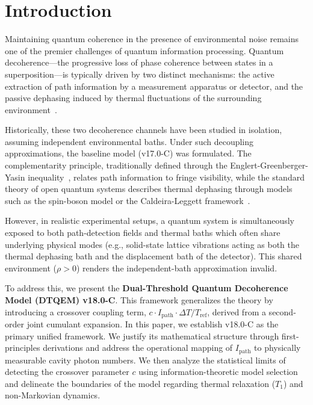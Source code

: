 \documentclass[reprint,amsmath,amssymb,aps,pra,superscriptaddress]{revtex4-2}
\begin{document}
\maketitle

\section{Introduction}

Maintaining quantum coherence in the presence of environmental noise remains one of the premier challenges of quantum information processing. Quantum decoherence---the progressive loss of phase coherence between states in a superposition---is typically driven by two distinct mechanisms: the active extraction of path information by a measurement apparatus or detector, and the passive dephasing induced by thermal fluctuations of the surrounding environment~\cite{breuer2002}. 

Historically, these two decoherence channels have been studied in isolation, assuming independent environmental baths. Under such decoupling approximations, the baseline model (v17.0-C) was formulated. The complementarity principle, traditionally defined through the Englert-Greenberger-Yasin inequality~\cite{englert1996}, relates path information to fringe visibility, while the standard theory of open quantum systems describes thermal dephasing through models such as the spin-boson model or the Caldeira-Leggett framework~\cite{weiss2012}. 

However, in realistic experimental setups, a quantum system is simultaneously exposed to both path-detection fields and thermal baths which often share underlying physical modes (e.g., solid-state lattice vibrations acting as both the thermal dephasing bath and the displacement bath of the detector). This shared environment ($\rho > 0$) renders the independent-bath approximation invalid.

To address this, we present the \textbf{Dual-Threshold Quantum Decoherence Model (DTQEM) v18.0-C}. This framework generalizes the theory by introducing a crossover coupling term, $c \cdot I_{\text{path}} \cdot \Delta T/T_{\text{ref}}$, derived from a second-order joint cumulant expansion. In this paper, we establish v18.0-C as the primary unified framework. We justify its mathematical structure through first-principles derivations and address the operational mapping of $I_{\text{path}}$ to physically measurable cavity photon numbers. We then analyze the statistical limits of detecting the crossover parameter $c$ using information-theoretic model selection and delineate the boundaries of the model regarding thermal relaxation ($T_1$) and non-Markovian dynamics.
\end{document}
